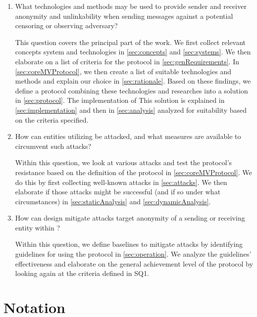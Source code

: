 \begin{enumerate}
	\item What technologies and methods may be used to provide sender and receiver anonymity and unlinkability when sending messages against a potential censoring or observing adversary? 
	
	This question covers the principal part of the work. We first collect relevant concepts system and technologies in \cref{sec:concepts} and \ref{sec:systems}. We then elaborate on a list of criteria for the \MessageVortex protocol in \cref{sec:genRequirements}. In \cref{sec:coreMVProtocol}, we then create a list of suitable technologies and methods and explain our choice in \cref{sec:rationale}. Based on these findings, we define a protocol combining these technologies and researches into a solution in \cref{sec:protocol}. The implementation of This solution is explained in \cref{sec:implementation} and then in \cref{sec:analysis} analyzed for suitability based on the criteria specified. 
	
	\item How can entities utilizing \MessageVortex be attacked, and what measures are available to circumvent such attacks? 
	
	Within this question, we look at various attacks and test the protocol's resistance based on the definition of the protocol in \cref{sec:coreMVProtocol}. We do this by first collecting well-known attacks in \cref{sec:attacks}. We then elaborate if those attacks might be successful (and if so under what circumstances) in \cref{sec:staticAnalysis} and \cref{sec:dynamicAnalysis}.
	
	\item How can design mitigate attacks target anonymity of a sending or receiving entity within \MessageVortex? 
	
	Within this question, we define baselines to mitigate attacks by identifying guidelines for using the protocol in \cref{sec:operation}. We analyze the guidelines' effectiveness and elaborate on the general achievement level of the protocol by looking again at the criteria defined in SQ1. 
	
\end{enumerate}

\chapter{Notation}

